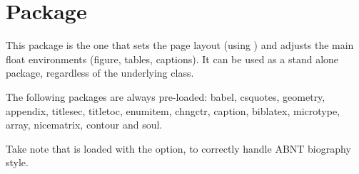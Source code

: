 \documentclass[dctools,english]{ufrgscca} %
\begin{document}
\section{ Package}
This package is the one that sets the page layout (using ) and adjusts the main float environments (figure, tables, captions).
It can be used as a stand alone package, regardless of the underlying class.

The following packages are always pre-loaded: {\MetaFmt[Pack]\sffamily babel, csquotes, geometry, appendix, titlesec, titletoc, enumitem, chngctr, caption, biblatex, microtype, array, nicematrix, contour} and {\MetaFmt[Pack]\sffamily soul}.

Take note that  is loaded with the \textbf{} option, to correctly handle ABNT biography style.
\end{document}
